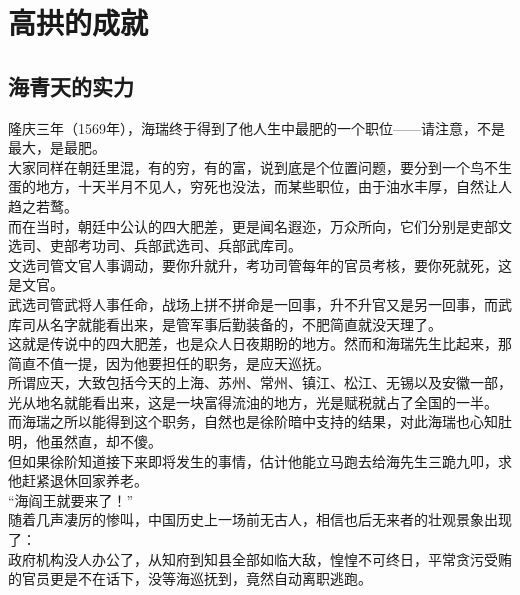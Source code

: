 \section{高拱的成就}
\ifnum{}
	\begin{multicols}{\theparacolNo}
\fi
\subsection{海青天的实力}
隆庆三年（1569年），海瑞终于得到了他人生中最肥的一个职位——请注意，不是最大，是最肥。\\

大家同样在朝廷里混，有的穷，有的富，说到底是个位置问题，要分到一个鸟不生蛋的地方，十天半月不见人，穷死也没法，而某些职位，由于油水丰厚，自然让人趋之若鹜。\\

而在当时，朝廷中公认的四大肥差，更是闻名遐迩，万众所向，它们分别是吏部文选司、吏部考功司、兵部武选司、兵部武库司。\\

文选司管文官人事调动，要你升就升，考功司管每年的官员考核，要你死就死，这是文官。\\

武选司管武将人事任命，战场上拼不拼命是一回事，升不升官又是另一回事，而武库司从名字就能看出来，是管军事后勤装备的，不肥简直就没天理了。\\

这就是传说中的四大肥差，也是众人日夜期盼的地方。然而和海瑞先生比起来，那简直不值一提，因为他要担任的职务，是应天巡抚。\\

所谓应天，大致包括今天的上海、苏州、常州、镇江、松江、无锡以及安徽一部，光从地名就能看出来，这是一块富得流油的地方，光是赋税就占了全国的一半。\\

而海瑞之所以能得到这个职务，自然也是徐阶暗中支持的结果，对此海瑞也心知肚明，他虽然直，却不傻。\\

但如果徐阶知道接下来即将发生的事情，估计他能立马跑去给海先生三跪九叩，求他赶紧退休回家养老。\\

“海阎王就要来了！”\\

随着几声凄厉的惨叫，中国历史上一场前无古人，相信也后无来者的壮观景象出现了：\\

政府机构没人办公了，从知府到知县全部如临大敌，惶惶不可终日，平常贪污受贿的官员更是不在话下，没等海巡抚到，竟然自动离职逃跑。\\


\end{multicols}

